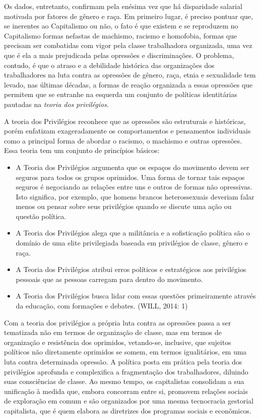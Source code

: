 Os dados, entretanto, confirmam pela enésima vez que há disparidade
salarial motivada por fatores de gênero e raça. Em primeiro lugar, é
preciso pontuar que, se inerentes ao Capitalismo ou não, o fato é que
existem e se reproduzem no Capitalismo formas nefastas de machismo,
racismo e homofobia, formas que precisam ser combatidas com vigor pela
classe trabalhadora organizada, uma vez que é ela a mais prejudicada
pelas opressões e discriminações. O problema, contudo, é que o atraso e
a debilidade histórica das organizações dos trabalhadores na luta contra
as opressões de gênero, raça, etnia e sexualidade tem levado, nas
últimas décadas, a formas de reação organizada a essas opressões que
permitem que se entranhe na esquerda um conjunto de políticas
identitárias pautadas na \emph{teoria dos privilégios}.

A teoria dos Privilégios reconhece que as opressões são estruturais e
históricas, porém enfatizam exageradamente os comportamentos e
pensamentos individuais como a principal forma de abordar o racismo, o
machismo e outras opressões. Essa teoria tem um conjunto de princípios
básicos:

\begin{itemize}
\item A Teoria dos Privilégios argumenta que os espaços do
movimento devem ser seguros para todos os grupos oprimidos. Uma forma de
tornar tais espaços seguros é negociando as relações entre uns e outros
de formas não opressivas. Isto significa, por exemplo, que homens
brancos heterossexuais deveriam falar menos ou pensar sobre seus
privilégios quando se discute uma ação ou questão política.

\item A Teoria dos Privilégios alega que a militância e a
sofisticação política são o domínio de uma elite privilegiada baseada em
privilégios de classe, gênero e raça.

\item A Teoria dos Privilégios atribui erros políticos e
estratégicos aos privilégios pessoais que as pessoas carregam para
dentro do movimento.

\item A Teoria dos Privilégios busca lidar com essas questões
primeiramente através da educação, com formações e debates. (WILL, 2014:
1)
\end{itemize}

Com a teoria dos privilégios a própria luta contra as opressões passa a
ser tematizada não em termos de organização de classe, mas em termos de
organização e resistência dos oprimidos, vetando-se, inclusive, que
sujeitos políticos não diretamente oprimidos se somem, em termos
igualitários, em uma luta contra determinada opressão. A política posta
em prática pela teoria dos privilégios aprofunda e complexifica a
fragmentação dos trabalhadores, diluindo suas consciências de classe. Ao
mesmo tempo, os capitalistas consolidam a sua unificação à medida que,
embora concorram entre si, promovem relações sociais de exploração em
comum e são organizados por uma mesma tecnocracia gestorial capitalista,
que é quem elabora as diretrizes dos programas sociais e econômicos.

